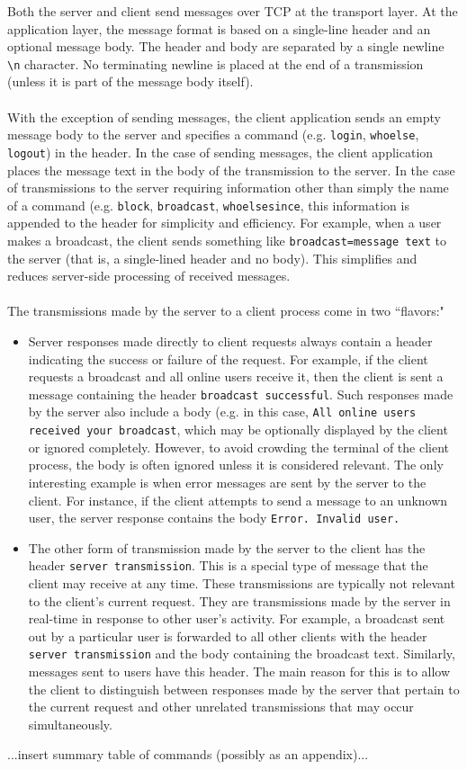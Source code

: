 \documentclass[12pt,a4paper]{article}
\begin{document}
Both the server and client send messages over TCP at the transport layer. At the application layer, the message format is based on a single-line header and an optional message body. The header and body are separated by a single newline \verb|\n| character. No terminating newline is placed at the end of a transmission (unless it is part of the message body itself).
\\\\
With the exception of sending messages, the client application sends an empty message body to the server and specifies a command (e.g. \verb|login|, \verb|whoelse|, \verb|logout|) in the header. In the case of sending messages, the client application places the message text in the body of the transmission to the server. In the case of transmissions to the server requiring information other than simply the name of a command (e.g. \verb|block|, \verb|broadcast|, \verb|whoelsesince|, this information is appended to the header for simplicity and efficiency. For example, when a user makes a broadcast, the client sends something like \verb|broadcast=message text| to the server (that is, a single-lined header and no body). This simplifies and reduces server-side processing of received messages.
\\\\
The transmissions made by the server to a client process come in two ``flavors:"
\begin{itemize}
	\item Server responses made directly to client requests always contain a header indicating the success or failure of the request. For example, if the client requests a broadcast and all online users receive it, then the client is sent a message containing the header \verb|broadcast successful|. Such responses made by the server also include a body (e.g. in this case, \verb|All online users received your broadcast|, which may be optionally displayed by the client or ignored completely. However, to avoid crowding the terminal of the client process, the body is often ignored unless it is considered relevant. The only interesting example is when error messages are sent by the server to the client. For instance, if the client attempts to send a message to an unknown user, the server response contains the body \verb|Error. Invalid user.|
	\item The other form of transmission made by the server to the client has the header \verb|server transmission|. This is a special type of message that the client may receive at any time. These transmissions are typically not relevant to the client's current request. They are transmissions made by the server in real-time in response to other user's activity. For example, a broadcast sent out by a particular user is forwarded to all other clients with the header \verb|server transmission| and the body containing the broadcast text. Similarly, messages sent to users have this header. The main reason for this is to allow the client to distinguish between responses made by the server that pertain to the current request and other unrelated transmissions that may occur simultaneously.
\end{itemize}
...insert summary table of commands (possibly as an appendix)...
\end{document}
